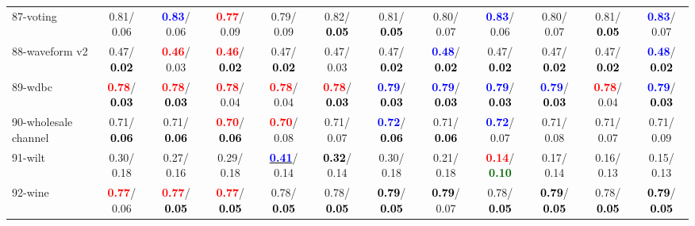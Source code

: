 \begin{table}[h]
\begin{center}
{\begin{tabular}{lc|c|c|c|c|c|c|c|c|c|c}
87-voting &   0.81/  0.06 & \textcolor{blue}{\textbf{  0.83}}/  0.06 & \textcolor{red}{\textbf{  0.77}}/  0.09 &   0.79/  0.09 &   0.82/\textcolor{black}{\textbf{  0.05}} &   0.81/\textcolor{black}{\textbf{  0.05}} &   0.80/  0.07 & \textcolor{blue}{\textbf{  0.83}}/  0.06 &   0.80/  0.07 &   0.81/\textcolor{black}{\textbf{  0.05}} & \textcolor{blue}{\textbf{  0.83}}/  0.07 \\
88-waveform v2 &   0.47/\textcolor{black}{\textbf{  0.02}} & \textcolor{red}{\textbf{  0.46}}/  0.03 & \textcolor{red}{\textbf{  0.46}}/\textcolor{black}{\textbf{  0.02}} &   0.47/\textcolor{black}{\textbf{  0.02}} &   0.47/  0.03 &   0.47/\textcolor{black}{\textbf{  0.02}} & \textcolor{blue}{\textbf{  0.48}}/\textcolor{black}{\textbf{  0.02}} &   0.47/\textcolor{black}{\textbf{  0.02}} &   0.47/\textcolor{black}{\textbf{  0.02}} &   0.47/\textcolor{black}{\textbf{  0.02}} & \textcolor{blue}{\textbf{  0.48}}/\textcolor{black}{\textbf{  0.02}} \\
89-wdbc & \textcolor{red}{\textbf{  0.78}}/\textcolor{black}{\textbf{  0.03}} & \textcolor{red}{\textbf{  0.78}}/\textcolor{black}{\textbf{  0.03}} & \textcolor{red}{\textbf{  0.78}}/  0.04 & \textcolor{red}{\textbf{  0.78}}/  0.04 & \textcolor{red}{\textbf{  0.78}}/\textcolor{black}{\textbf{  0.03}} & \textcolor{blue}{\textbf{  0.79}}/\textcolor{black}{\textbf{  0.03}} & \textcolor{blue}{\textbf{  0.79}}/\textcolor{black}{\textbf{  0.03}} & \textcolor{blue}{\textbf{  0.79}}/\textcolor{black}{\textbf{  0.03}} & \textcolor{blue}{\textbf{  0.79}}/\textcolor{black}{\textbf{  0.03}} & \textcolor{red}{\textbf{  0.78}}/  0.04 & \textcolor{blue}{\textbf{  0.79}}/\textcolor{black}{\textbf{  0.03}} \\
90-wholesale channel &   0.71/\textcolor{black}{\textbf{  0.06}} &   0.71/\textcolor{black}{\textbf{  0.06}} & \textcolor{red}{\textbf{  0.70}}/\textcolor{black}{\textbf{  0.06}} & \textcolor{red}{\textbf{  0.70}}/  0.08 &   0.71/  0.07 & \textcolor{blue}{\textbf{  0.72}}/\textcolor{black}{\textbf{  0.06}} &   0.71/\textcolor{black}{\textbf{  0.06}} & \textcolor{blue}{\textbf{  0.72}}/  0.07 &   0.71/  0.08 &   0.71/  0.07 &   0.71/  0.09 \\
91-wilt &   0.30/  0.18 &   0.27/  0.16 &   0.29/  0.18 & \underline{\textcolor{blue}{\textbf{  0.41}}}/  0.14 & \textcolor{black}{\textbf{  0.32}}/  0.14 &   0.30/  0.18 &   0.21/  0.18 & \textcolor{red}{\textbf{  0.14}}/\textcolor{darkgreen}{\textbf{  0.10}} &   0.17/  0.14 &   0.16/  0.13 &   0.15/  0.13 \\
92-wine & \textcolor{red}{\textbf{  0.77}}/  0.06 & \textcolor{red}{\textbf{  0.77}}/\textcolor{black}{\textbf{  0.05}} & \textcolor{red}{\textbf{  0.77}}/\textcolor{black}{\textbf{  0.05}} &   0.78/\textcolor{black}{\textbf{  0.05}} &   0.78/\textcolor{black}{\textbf{  0.05}} & \textcolor{black}{\textbf{  0.79}}/\textcolor{black}{\textbf{  0.05}} & \textcolor{black}{\textbf{  0.79}}/  0.07 &   0.78/\textcolor{black}{\textbf{  0.05}} & \textcolor{black}{\textbf{  0.79}}/\textcolor{black}{\textbf{  0.05}} &   0.78/\textcolor{black}{\textbf{  0.05}} & \textcolor{black}{\textbf{  0.79}}/\textcolor{black}{\textbf{  0.05}} \\ \hline

\end{tabular}}
\end{center}
\end{table}
